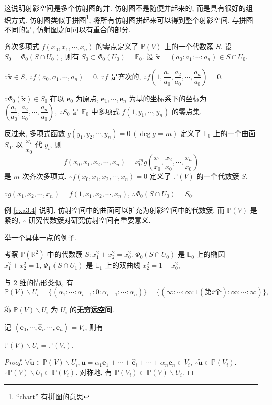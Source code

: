 \documentclass[color=black,device=normal,lang=cn,mode=geye]{elegantnote}
\begin{document}
这说明射影空间是多个仿射图的并. 仿射图不是随便并起来的, 而是具有很好的组织方式. 仿射图类似于拼图\footnote{``chart'' 有拼图的意思}, 将所有仿射图拼起来可以得到整个射影空间. 与拼图不同的是, 仿射图之间可以有重合的部分.
\begin{example}\label{exa3.4}
    齐次多项式 $f(x_0,x_1,\cdots,x_n)$ 的零点定义了 $\mathbb{P}(V)$ 上的一个代数簇 $S$. 设 $S_0=\Phi_0(S\cap U_0)$, 则有 $S_0\subset\Phi_0(U_0)=\mathbb{E}_0$. 设 $\tilde{\boldsymbol{x}}=(a_0:a_1:\cdots:a_n)\in S\cap U_0$.
    
    $\because\tilde{\boldsymbol{x}}\in S$, $\therefore f(a_0,a_1,\cdots,a_n)=0$. $\because f$ 是齐次的, $\therefore f\left(1,\dfrac{a_1}{a_0},\dfrac{a_2}{a_0},\cdots,\dfrac{a_n}{a_0}\right)=0$.
    
    $\because\Phi_0(\tilde{\boldsymbol{x}})\in S_0$ 在以 $\boldsymbol{e}_0$ 为原点, $\boldsymbol{e}_1,\cdots,\boldsymbol{e}_n$ 为基的坐标系下的坐标为 $\left(\dfrac{a_1}{a_0},\dfrac{a_2}{a_0},\cdots,\dfrac{a_n}{a_0}\right)$, $\therefore S_0$ 是 $\mathbb{E}_0$ 中多项式 $f(1,y_1,\cdots,y_n)$ 的零点集.

    反过来, 多项式函数 $g(y_1,y_2,\cdots,y_n)=0\ (\deg g=m)$ 定义了 $\mathbb{E}_0$ 上的一个曲面 $S_0$. 以 $\dfrac{x_i}{x_0}$ 代 $y_i$, 则
    \[f(x_0,x_1,x_2,\cdots,x_n)=x_0^mg\left(\dfrac{x_1}{x_0},\dfrac{x_2}{x_0},\cdots,\dfrac{x_n}{x_0}\right)\]
    是 $m$ 次齐次多项式. $\therefore f(x_0,x_1,x_2,\cdots,x_n)=0$ 定义了 $\mathbb{P}(V)$ 的一个代数簇 $S$.
    
    $\because g(x_1,x_2,\cdots,x_n)=f(1,x_1,x_2,\cdots,x_n)$, $\therefore\Phi_0(S\cap U_0)=S_0$.
\end{example}
例 \ref{exa3.4} 说明, 仿射空间中的曲面可以扩充为射影空间中的代数簇, 而 $\mathbb{P}(V)$ 是紧的, $\therefore$ 研究代数簇对研究仿射空间有重要意义.

举一个具体一点的例子.
\begin{example}
    考察 $\mathbb{P}(\mathbb{R}^2)$ 中的代数簇 $S:x_1^2+x_2^2=x_0^2$. $\Phi_0(S\cap U_0)$ 是 $\mathbb{E}_0$ 上的椭圆 $x_1^2+x_2^2=1$, $\Phi_1(S\cap U_1)$ 是 $\mathbb{E}_1$ 上的双曲线 $x_2^2=1+x_0^2$,
\end{example}

与 $2$ 维的情形类似, 有
\[\mathbb{P}(V)\backslash U_i=\{(\alpha_1:\cdots:\alpha_{i-1}:0:\alpha_{i+1}:\cdots:\alpha_n)\}=\{(\infty:\cdots:\infty:1(\text{第}i\text{个}):\infty:\cdots:\infty)\},\]

称 $\mathbb{P}(V)\backslash U_i$ 为 $U_i$ 的\textbf{无穷远空间}.

记 $\left<\boldsymbol{e}_0,\cdots,\widehat{\boldsymbol{e}}_i,\cdots,\boldsymbol{e}_n\right>=V_i$, 则有
\begin{theorem}
    $\mathbb{P}(V)\backslash U_i=\mathbb{P}(V_i)$.
\end{theorem}
\begin{proof}
    $\forall\tilde{\boldsymbol{u}}\in\mathbb{P}(V)\backslash U_i,\boldsymbol{u}=\alpha_1\boldsymbol{e}_1+\cdots+\hat{\boldsymbol{e}}_i+\cdots+\alpha_n\boldsymbol{e}_n\in V_i$, $\therefore\tilde{\boldsymbol{u}}\in\mathbb{P}(V_i)$. $\therefore\mathbb{P}(V)\backslash U_i\subset\mathbb{P}(V_i)$. 对称地, 有 $\mathbb{P}(V_i)\subset\mathbb{P}(V)\backslash U_i$.
\end{proof}
\end{document}
